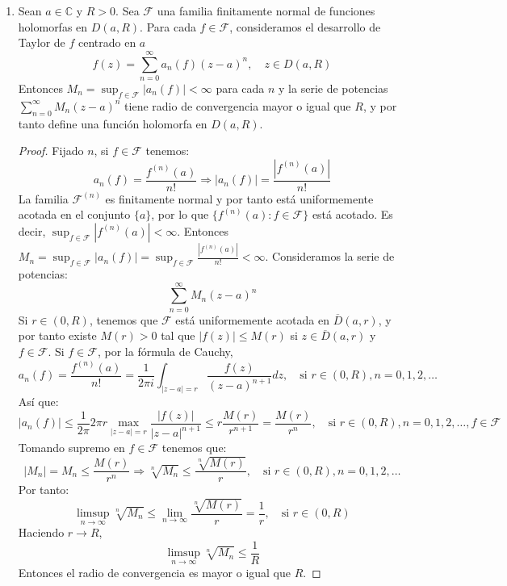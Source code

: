 \begin{example}
\begin{enumerate}
        \item Sean $a \in \mathbb{C}$ y $R > 0$.
              Sea $\mathcal{F}$ una familia finitamente normal de funciones holomorfas en $D(a, R)$.
              Para cada $f \in \mathcal{F}$, consideramos el desarrollo de Taylor de $f$ centrado en $a$
              $$f(z) = \sum_{n=0}^\infty a_n(f)(z-a)^n, \quad z \in D(a, R)$$
              Entonces $M_n = \sup_{f \in \mathcal{F}} |a_n(f)| < \infty$ para cada $n$ y la serie de potencias $\sum_{n=0}^\infty M_n(z-a)^n$ tiene radio de convergencia mayor o igual que $R$, y por tanto define una función holomorfa en $D(a, R)$.

              \begin{proof}
                  Fijado $n$, si $f \in \mathcal{F}$ tenemos:
                  $$a_n(f) = \frac{f^{(n)}(a)}{n!} \Rightarrow |a_n(f)| = \frac{|f^{(n)}(a)|}{n!}$$
                  La familia $\mathcal{F}^{(n)}$ es finitamente normal y por tanto está uniformemente acotada en el conjunto $\{a\}$, por lo que $\{f^{(n)}(a) : f \in \mathcal{F}\}$ está acotado.
                  Es decir, $\sup_{f \in \mathcal{F}} |f^{(n)}(a)| < \infty$.
                  Entonces $M_n = \sup_{f \in \mathcal{F}} |a_n(f)| = \sup_{f \in \mathcal{F}} \frac{|f^{(n)}(a)|}{n!} < \infty$.
                  Consideramos la serie de potencias:
                  $$\sum_{n=0}^\infty M_n(z-a)^n$$
                  Si $r \in (0, R)$, tenemos que $\mathcal{F}$ está uniformemente acotada en $\overline{D}(a, r)$, y por tanto existe $M(r) > 0$ tal que $|f(z)| \leq M(r)$ si $z \in \overline{D}(a, r)$ y $f \in \mathcal{F}$.
                  Si $f \in \mathcal{F}$, por la fórmula de Cauchy,
                  $$a_n(f) = \frac{f^{(n)}(a)}{n!} = \frac{1}{2\pi i} \int_{|z-a|=r} \frac{f(z)}{(z-a)^{n+1}}dz, \quad \text{si } r \in (0, R), n = 0, 1, 2, \dots$$
                  Así que:
                  $$|a_n(f)| \leq \frac{1}{2\pi} 2\pi r \max_{|z-a|=r} \frac{|f(z)|}{|z-a|^{n+1}} \leq r\frac{M(r)}{r^{n+1}} = \frac{M(r)}{r^n}, \quad \text{si } r \in (0, R), n = 0, 1, 2, \dots, f \in \mathcal{F}$$
                  Tomando supremo en $f \in \mathcal{F}$ tenemos que:
                  $$|M_n| = M_n \leq \frac{M(r)}{r^n} \Rightarrow \sqrt[n]{M_n} \leq \frac{\sqrt[n]{M(r)}}{r}, \quad \text{si } r \in (0, R), n = 0, 1, 2, \dots$$
                  Por tanto:
                  $$\limsup_{n \to \infty} \sqrt[n]{M_n} \leq \lim_{n \to \infty} \frac{\sqrt[n]{M(r)}}{r} = \frac{1}{r}, \quad \text{si } r \in (0, R)$$
                  Haciendo $r \to R$,
                  $$\limsup_{n \to \infty} \sqrt[n]{M_n} \leq \frac{1}{R}$$
                  Entonces el radio de convergencia es mayor o igual que $R$.
              \end{proof}


\end{enumerate}
\end{example}
